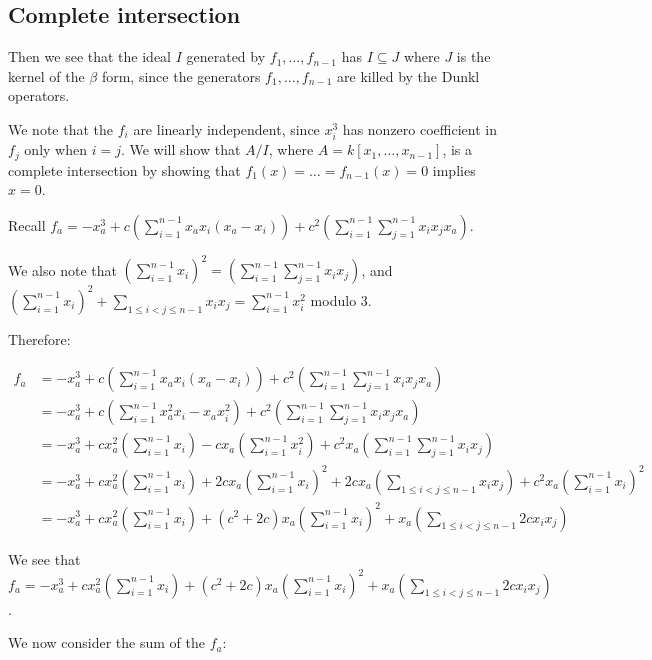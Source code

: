 \documentclass{article}
\numberwithin{equation}{section}
\begin{document}
\subsection{Complete intersection}

Then we see that the ideal $I$ generated by $f_1,\dots,f_{n-1}$ has $I \subseteq J$ where $J$ is the kernel of the $\beta$ form, since the generators $f_1,\dots,f_{n-1}$ are killed by the Dunkl operators. 

We note that the $f_i$ are linearly independent, since $x_i^3$ has nonzero coefficient in $f_j$ only when $i=j$. We will show that $A/I$, where $A=k[x_1,\dots,x_{n-1}]$, is a complete intersection by showing that $f_1(x) = \dots = f_{n-1}(x)=0$ implies $x=0$. 

Recall $f_a = -x_a^3+c \left(\sum_{i=1}^{n-1} x_ax_i(x_a-x_i)\right)+c^2 \left(\sum_{i=1}^{n-1} \sum_{j=1}^{n-1} x_ix_jx_a\right)$.

We also note that $\left(\sum_{i=1}^{n-1} x_i \right)^2= \left(\sum_{i=1}^{n-1} \sum_{j=1}^{n-1} x_ix_j\right)$, and $\left(\sum_{i=1}^{n-1} x_i \right)^2+\sum_{1 \le i < j \le n-1} x_ix_j = \sum_{i=1}^{n-1} x_i^2$ modulo $3$. 

Therefore:

\begin{align*}
f_a &= -x_a^3+c \left(\sum_{i=1}^{n-1} x_ax_i(x_a-x_i)\right)+c^2 \left(\sum_{i=1}^{n-1} \sum_{j=1}^{n-1} x_ix_jx_a\right)\\
&= -x_a^3+c \left(\sum_{i=1}^{n-1} x_a^2x_i-x_ax_i^2\right)+c^2 \left(\sum_{i=1}^{n-1} \sum_{j=1}^{n-1} x_ix_jx_a\right)\\
&= -x_a^3+cx_a^2 \left(\sum_{i=1}^{n-1} x_i\right) -cx_a\left( \sum_{i=1}^{n-1} x_i^2\right)+c^2x_a \left(\sum_{i=1}^{n-1} \sum_{j=1}^{n-1} x_ix_j\right)\\
&= -x_a^3+cx_a^2 \left(\sum_{i=1}^{n-1} x_i\right) +2cx_a\left(\sum_{i=1}^{n-1} x_i \right)^2+2cx_a\left(\sum_{1 \le i < j \le n-1} x_ix_j\right)+c^2x_a\left(\sum_{i=1}^{n-1} x_i \right)^2\\
&=-x_a^3+c x_a^2\left(\sum_{i=1}^{n-1} x_i \right)+(c^2+2c)x_a\left(\sum_{i=1}^{n-1} x_i\right)^2+x_a\left(\sum_{1 \le i < j  \le n-1} 2cx_ix_j\right)
\end{align*}

We see that $f_a=-x_a^3+c x_a^2\left(\sum_{i=1}^{n-1} x_i \right)+(c^2+2c)x_a\left(\sum_{i=1}^{n-1} x_i\right)^2+x_a\left(\sum_{1 \le i < j  \le n-1} 2cx_ix_j\right)$. 


We now consider the sum of the $f_a$:
\end{document}
